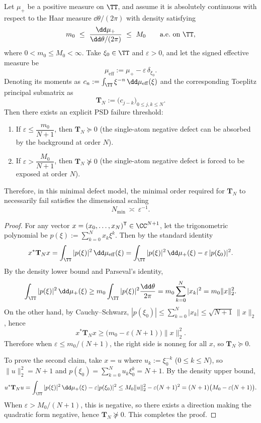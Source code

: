 \begin{proposition}\label{prop:discussion-toeplitz-negative-atom-threshold}
Let \(\mu_+\) be a positive measure on \(\TT\), and assume it is absolutely continuous with respect to the Haar measure \(\dd\theta/(2\pi)\) with density satisfying
\[
m_0\ \le\ \frac{\dd\mu_+}{\dd\theta/(2\pi)}\ \le\ M_0
\qquad\text{a.e.\ on }\TT,
\]
where \(0<m_0\le M_0<\infty\).
Take \(\xi_0\in\TT\) and \(\varepsilon>0\), and let the signed effective measure be
\[
\mu_{\mathrm{eff}}:=\mu_+-\varepsilon\,\delta_{\xi_0}.
\]
Denoting its moments as
\(
c_n:=\int_{\TT}\xi^{-n}\,\dd\mu_{\mathrm{eff}}(\xi)
\)
and the corresponding Toeplitz principal submatrix as
\[
\mathbf{T}_N:=\bigl(c_{j-k}\bigr)_{0\le j,k\le N}.
\]
Then there exists an explicit PSD failure threshold:
\begin{enumerate}
  \item If \(\varepsilon\le \dfrac{m_0}{N+1}\), then \(\mathbf{T}_N\succeq 0\) (the single-atom negative defect can be absorbed by the background at order \(N\)).
  \item If \(\varepsilon> \dfrac{M_0}{N+1}\), then \(\mathbf{T}_N\not\succeq 0\) (the single-atom negative defect is forced to be exposed at order \(N\)).
\end{enumerate}
Therefore, in this minimal defect model, the minimal order required for \(\mathbf{T}_N\) to necessarily fail satisfies the dimensional scaling
\[
N_{\min}\ \asymp\ \varepsilon^{-1}.
\]
\end{proposition}

\begin{proof}
For any vector \(x=(x_0,\dots,x_N)^{\mathsf T}\in\CC^{N+1}\), let the trigonometric polynomial be
\(
p(\xi):=\sum_{k=0}^{N}x_k\xi^k
\).
Then by the standard identity
\[
x^\ast \mathbf{T}_N x
=\int_{\TT}|p(\xi)|^2\,\dd\mu_{\mathrm{eff}}(\xi)
=\int_{\TT}|p(\xi)|^2\,\dd\mu_+(\xi)-\varepsilon\,|p(\xi_0)|^2.
\]
By the density lower bound and Parseval's identity,
\[
\int_{\TT}|p(\xi)|^2\,\dd\mu_+(\xi)
\ge m_0\int_{\TT}|p(\xi)|^2\frac{\dd\theta}{2\pi}
=m_0\sum_{k=0}^{N}|x_k|^2
=m_0\|x\|_2^2.
\]
On the other hand, by Cauchy--Schwarz,
\(
|p(\xi_0)|
\le \sum_{k=0}^{N}|x_k|
\le \sqrt{N+1}\,\|x\|_2
\), hence
\[
x^\ast \mathbf{T}_N x
\ge \bigl(m_0-\varepsilon(N+1)\bigr)\|x\|_2^2.
\]
Therefore when \(\varepsilon\le m_0/(N+1)\), the right side is nonneg for all \(x\), so \(\mathbf{T}_N\succeq 0\).
\par
To prove the second claim, take \(x=u\) where \(u_k:=\xi_0^{-k}\) (\(0\le k\le N\)), so \(\|u\|_2^2=N+1\) and \(p(\xi_0)=\sum_{k=0}^{N}u_k\xi_0^k=N+1\).
By the density upper bound,
\[
u^\ast \mathbf{T}_N u
=\int_{\TT}|p(\xi)|^2\,\dd\mu_+(\xi)-\varepsilon|p(\xi_0)|^2
\le M_0\|u\|_2^2-\varepsilon(N+1)^2
=(N+1)\bigl(M_0-\varepsilon(N+1)\bigr).
\]
When \(\varepsilon> M_0/(N+1)\), this is negative, so there exists a direction making the quadratic form negative, hence \(\mathbf{T}_N\not\succeq 0\). This completes the proof.
\end{proof}

